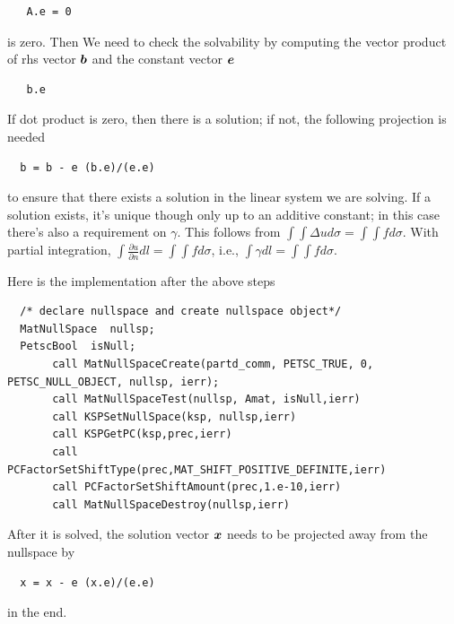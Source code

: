 \documentclass{report}
\newcommand{\bm}[1]{\mbox{\boldmath $#1$}}
\newcommand{\pp}[2]{\frac{\partial{#1}}{\partial{#2}}}
\begin{document}
\begin{verbatim}
   A.e = 0  
\end{verbatim}

\noindent
is zero. Then We need to check the solvability by computing the vector product of 
rhs vector $\bm{b}$ and the constant vector $\bm{e}$

\begin{verbatim}
   b.e
\end{verbatim}

\noindent
If dot product is zero, then there is a solution;
if not, the following projection is needed

\begin{verbatim}
  b = b - e (b.e)/(e.e)
\end{verbatim}

\noindent
to ensure that there exists a solution in the linear system we are solving.
If a solution exists, it’s unique though only up to an additive constant;
in this case there’s also a requirement on $\gamma$.
This follows from $\int\int \Delta u d\sigma = \int\int f d\sigma$. With partial integration,
$\int \pp{u}{n} dl = \int\int f d\sigma$, i.e., 
$\int \gamma dl = \int\int f d\sigma$.

\noindent
Here is the implementation after the above steps

\begin{verbatim}
  /* declare nullspace and create nullspace object*/
  MatNullSpace  nullsp;
  PetscBool  isNull;
       call MatNullSpaceCreate(partd_comm, PETSC_TRUE, 0, PETSC_NULL_OBJECT, nullsp, ierr);
       call MatNullSpaceTest(nullsp, Amat, isNull,ierr)
       call KSPSetNullSpace(ksp, nullsp,ierr)
       call KSPGetPC(ksp,prec,ierr)
       call PCFactorSetShiftType(prec,MAT_SHIFT_POSITIVE_DEFINITE,ierr)
       call PCFactorSetShiftAmount(prec,1.e-10,ierr)
       call MatNullSpaceDestroy(nullsp,ierr)
\end{verbatim}

\noindent
After it is solved, the solution vector $\bm{x}$ needs to be projected away from the nullspace by
\begin{verbatim}
  x = x - e (x.e)/(e.e)
\end{verbatim}

\noindent
in the end.
\end{document}
